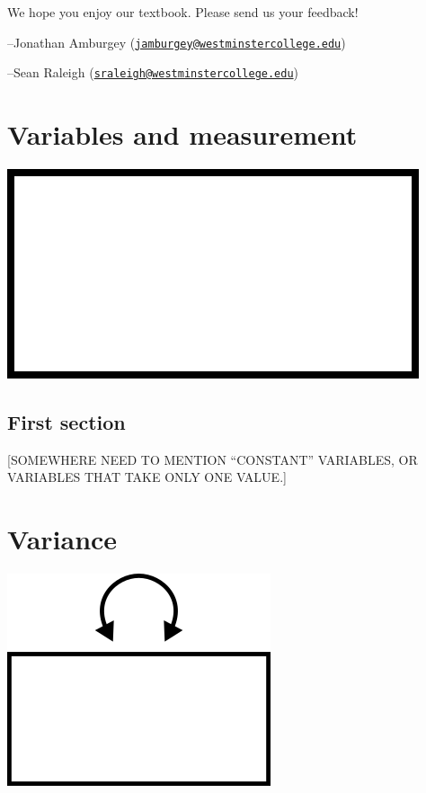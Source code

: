 \documentclass[
]{book}
\begin{document}
We hope you enjoy our textbook. Please send us your feedback!

--Jonathan Amburgey (\href{mailto:jamburgey@westminstercollege.edu}{\nolinkurl{jamburgey@westminstercollege.edu}})

--Sean Raleigh (\href{mailto:sraleigh@westminstercollege.edu}{\nolinkurl{sraleigh@westminstercollege.edu}})

\hypertarget{variables}{%
\chapter{Variables and measurement}\label{variables}}

\begin{center}\includegraphics{graphics/variable} \end{center}

\hypertarget{variables-first-section}{%
\section{First section}\label{variables-first-section}}

{[}SOMEWHERE NEED TO MENTION ``CONSTANT'' VARIABLES, OR VARIABLES THAT TAKE ONLY ONE VALUE.{]}

\hypertarget{variance}{%
\chapter{Variance}\label{variance}}

\begin{center}\includegraphics{graphics/variance} \end{center}
\end{document}
